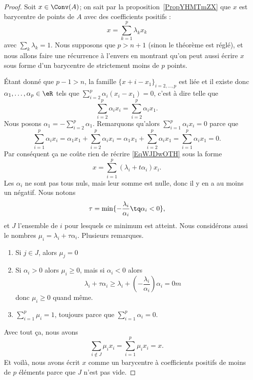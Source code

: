 \begin{proof}
    Soit \( x\in\Conv(A)\); on sait par la proposition~\ref{PropYHMTmZX} que \( x\) est barycentre de points de \( A\) avec des coefficients positifs :
    \begin{equation}    \label{EqWJDwOTH}
        x=\sum_{k=1}^p\lambda_kx_k
    \end{equation}
    avec \( \sum_k\lambda_k=1\). Nous supposons que \( p>n+1\) (sinon le théorème est réglé), et nous allons faire une récurrence à l'envers en montrant qu'on peut aussi écrire \( x\) sous forme d'un barycentre de strictement moins de \( p\) points.

    Étant donné que \( p-1>n\), la famille \( \{ x+i-x_1 \}_{i=2,\ldots, p}\) est liée et il existe donc \( \alpha_1,\ldots, \alpha_p\in \eR\) tels que \( \sum_{i=2}^p\alpha_i(x_i-x_1)=0\), c'est à dire telle que
    \begin{equation}
        \sum_{i=2}^p\alpha_ix_i=\sum_{i=2}^p\alpha_ix_1.
    \end{equation}
    Nous posons \( \alpha_1=-\sum_{i=2}^p\alpha_1\). Remarquons qu'alors \( \sum_{i=1}^p\alpha_ix_i=0\) parce que
    \begin{equation}
        \sum_{i=1}^p\alpha_ix_i=\alpha_1x_1+\sum_{i=2}^p\alpha_ix_i=\alpha_1x_1+\sum_{i=2}^p\alpha_ix_1=\sum_{i=1}^p\alpha_ix_1=0.
    \end{equation}
    Par conséquent ça ne coûte rien de récrire \eqref{EqWJDwOTH} sous la forme
    \begin{equation}
        x=\sum_{i=1}^p(\lambda_i+t\alpha_i)x_i.
    \end{equation}
    Les \( \alpha_i\) ne sont pas tous nuls, mais leur somme est nulle, donc il y en a au moins un négatif. Nous notons
    \begin{equation}
        \tau=\min\{ -\frac{ \lambda_i }{ \alpha_i }\tq \alpha_i<0 \},
    \end{equation}
    et \( J\) l'ensemble de \( i\) pour lesquels ce minimum est atteint. Nous considérons aussi le nombres \( \mu_i=\lambda_i+\tau\alpha_i\). Plusieurs remarques.
    \begin{enumerate}
        \item
            Si \( j\in J\), alors \( \mu_j=0\)
        \item
            Si \( \alpha_i>0\) alors \( \mu_i\geq 0\), mais si \( \alpha_i<0\) alors
            \begin{equation}
                \lambda_i+\tau\alpha_i\geq \lambda_i+(-\frac{ \lambda_i }{ \alpha_i })\alpha_i=0m
            \end{equation}
            donc \( \mu_i\geq 0\) quand même.
        \item
            \( \sum_{i=1}^p\mu_i=1\), toujours parce que \( \sum_{i=1}^p\alpha_i=0\).
    \end{enumerate}
    Avec tout ça, nous avons
    \begin{equation}
        \sum_{i\notin J}\mu_ix_i=\sum_{i=1}^p\mu_ix_i=x.
    \end{equation}
    Et voilà, nous avons écrit \( x\) comme un barycentre à coefficients positifs de moins de \( p\) éléments parce que \( J\) n'est pas vide.
\end{proof}

